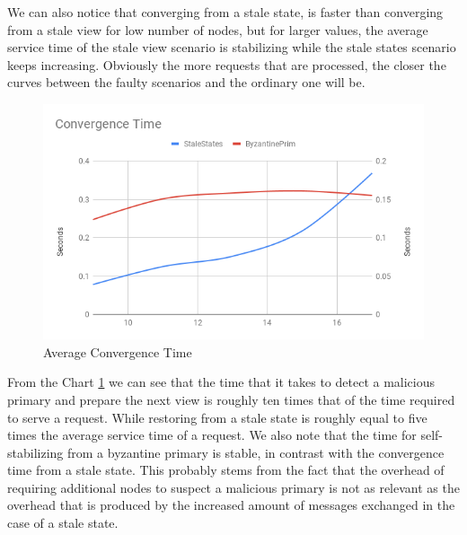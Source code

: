 \documentclass[12pt,a4paper]{report}
\begin{document}
		We can also notice that converging from a stale state, is faster than converging from a stale view for low number of nodes, but for larger values, the average service time of the stale view scenario is stabilizing while the stale states scenario keeps increasing. Obviously the more requests that are processed, the closer the curves between the faulty scenarios and the ordinary one will be.
		
		\begin{figure}
		    \centering
		    \includegraphics[scale=0.7]{ade/Convergence_Time.png}
		    \caption{Average Convergence Time}
		    \label{fig:convergencetime}
		\end{figure}
		
		From the Chart \ref{fig:convergencetime} we can see that the time that it takes to detect a malicious primary and prepare the next view is roughly ten times that of the time required to serve a request. While restoring from a stale state is roughly equal to five times the average service time of a request. We also note that the time for self-stabilizing from a byzantine primary is stable, in contrast with the convergence time from a stale state. This probably stems from the fact that the overhead of requiring additional nodes to suspect a malicious primary is not as relevant as the overhead that is produced by the increased amount of messages exchanged in the case of a stale state.
		
\end{document}
